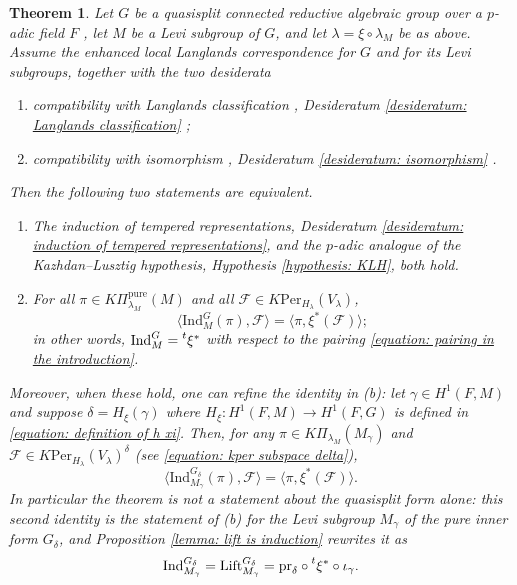 \documentclass[11pt,letterpaper]{amsart}
\newcommand{\pure}{\mathrm{pure}}
\newcommand{\pr}{\mathrm{pr}}
\newcommand{\Ind}{\mathrm{Ind}}
\newcommand{\Per}{\mathrm{Per}}
\newcommand{\Lift}{\mathrm{Lift}}
\newtheorem{thm}{Theorem}[section]
\renewcommand{\1}{\mathbbm{1}}
\numberwithin{equation}{section}
\begin{document}
\begin{thm}\label{theorem: main theorem in the introduction}
    Let $G$ be a  {quasisplit} connected reductive algebraic group over a $p$-adic field $F$ {, let $M$ be a Levi subgroup of $G$, and let $\lambda=\xi\circ\lambda_M$ be as above}.  {Assume} the enhanced local Langlands correspondence  {for $G$ and for its Levi subgroups, together with the two desiderata}
    \begin{enumerate}
        \item compatibility with Langlands classification {, Desideratum} \ref{desideratum: Langlands classification} {;}
        \item compatibility with isomorphism {, Desideratum} \ref{desideratum: isomorphism} {.}
        \end{enumerate}
     {Then the following two statements are equivalent.}
    \begin{enumerate}
        \item[ {(a)}]  {The induction of tempered representations, Desideratum \ref{desideratum: induction of tempered representations}, and the $p$-adic analogue of the Kazhdan--Lusztig hypothesis, Hypothesis \ref{hypothesis: KLH}, both hold.}
        \item[ {(b)}]  {For all $\pi\in K\Pi_{\lambda_M}^\pure(M)$ and all $\mathcal{F} \in K\Per_{H_\lambda}(V_\lambda)$,}
        \[\langle \Ind_M^G(\pi),\mathcal{F}\rangle = \langle \pi,\xi^*(\mathcal{F})\rangle;\]
         {in other words, $\Ind_M^G=\prescript{t}{}{\xi^*}$ with respect to the pairing \eqref{equation: pairing in the introduction}.}
    \end{enumerate}
    Moreover,  {when these hold,} one can refine  {the identity in (b)}: let $\gamma \in H^1(F,M)$ and suppose $\delta=H_\xi(\gamma)$ where $H_\xi: H^1(F,M) \to H^1(F,G)$ is defined in \eqref{equation: definition of h xi}. Then, for any $\pi \in K\Pi_{\lambda_M}(M_\gamma)$ and $\mathcal{F}\in K\Per_{H_\lambda}(V_\lambda)^\delta$ (see \eqref{equation: kper subspace delta}),
    \[\langle \Ind_{M_\gamma}^{G_\delta}(\pi),\mathcal{F} \rangle = \langle \pi, 
    \xi^*(\mathcal{F})\rangle.\]
     {In particular the theorem is not a statement about the quasisplit form alone: this second identity is the statement of \textup{(b)} for the Levi subgroup $M_\gamma$ of the pure inner form $G_\delta$, and Proposition \ref{lemma: lift is induction} rewrites it as}
    \[ {\Ind_{M_\gamma}^{G_\delta}=\Lift_{M_\gamma}^{G_\delta}=\pr_\delta\circ \prescript{t}{}{\xi^*}\circ \iota_\gamma.}\]
\end{thm}
\end{document}
